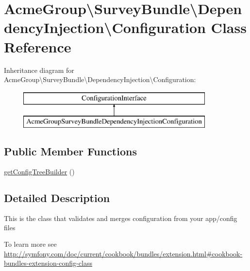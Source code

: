 \hypertarget{class_acme_group_1_1_survey_bundle_1_1_dependency_injection_1_1_configuration}{\section{Acme\+Group\textbackslash{}Survey\+Bundle\textbackslash{}Dependency\+Injection\textbackslash{}Configuration Class Reference}
\label{class_acme_group_1_1_survey_bundle_1_1_dependency_injection_1_1_configuration}
}
Inheritance diagram for Acme\+Group\textbackslash{}Survey\+Bundle\textbackslash{}Dependency\+Injection\textbackslash{}Configuration\+:\begin{figure}[H]
\begin{center}
\leavevmode
\includegraphics[height=2.000000cm]{class_acme_group_1_1_survey_bundle_1_1_dependency_injection_1_1_configuration}
\end{center}
\end{figure}
\subsection*{Public Member Functions}
\begin{DoxyCompactItemize}
\item 
\hyperlink{class_acme_group_1_1_survey_bundle_1_1_dependency_injection_1_1_configuration_a69d33c62265fc08285191b3afe3a1b2d}{get\+Config\+Tree\+Builder} ()
\end{DoxyCompactItemize}


\subsection{Detailed Description}
This is the class that validates and merges configuration from your app/config files

To learn more see \hyperlink{}{http\+://symfony.\+com/doc/current/cookbook/bundles/extension.\+html\#cookbook-\/bundles-\/extension-\/config-\/class} 

